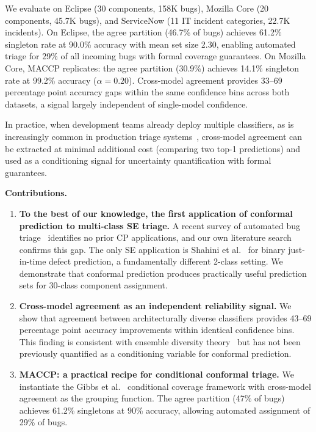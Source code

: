 \documentclass[conference]{IEEEtran}
\begin{document}
We evaluate on Eclipse (30 components, 158K bugs), Mozilla Core (20 components, 45.7K bugs), and ServiceNow (11 IT incident categories, 22.7K incidents). On Eclipse, the agree partition (46.7\% of bugs) achieves 61.2\% singleton rate at 90.0\% accuracy with mean set size 2.30, enabling automated triage for 29\% of all incoming bugs with formal coverage guarantees. On Mozilla Core, MACCP replicates: the agree partition (30.9\%) achieves 14.1\% singleton rate at 99.2\% accuracy ($\alpha{=}0.20$). Cross-model agreement provides 33--69 percentage point accuracy gaps within the same confidence bins across both datasets, a signal largely independent of single-model confidence.

In practice, when development teams already deploy multiple classifiers, as is increasingly common in production triage systems~\cite{chen2025triangle,xu2026whatscode}, cross-model agreement can be extracted at minimal additional cost (comparing two top-1 predictions) and used as a conditioning signal for uncertainty quantification with formal guarantees.

\smallskip\noindent\textbf{Contributions.}
\begin{enumerate}
\item \textbf{To the best of our knowledge, the first application of conformal prediction to multi-class SE triage.} A recent survey of automated bug triage~\cite{zhao2025triage} identifies no prior CP applications, and our own literature search confirms this gap. The only SE application is Shahini et al.~\cite{shahini2024conformal} for binary just-in-time defect prediction, a fundamentally different 2-class setting. We demonstrate that conformal prediction produces practically useful prediction sets for 30-class component assignment.

\item \textbf{Cross-model agreement as an independent reliability signal.} We show that agreement between architecturally diverse classifiers provides 43--69 percentage point accuracy improvements within identical confidence bins. This finding is consistent with ensemble diversity theory~\cite{kuncheva2003measures} but has not been previously quantified as a conditioning variable for conformal prediction.

\item \textbf{MACCP: a practical recipe for conditional conformal triage.} We instantiate the Gibbs et al.~\cite{gibbs2025conditional} conditional coverage framework with cross-model agreement as the grouping function. The agree partition (47\% of bugs) achieves 61.2\% singletons at 90\% accuracy, allowing automated assignment of 29\% of bugs.
\end{enumerate}
\end{document}
